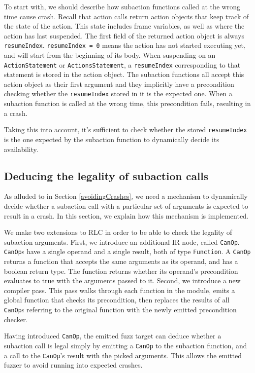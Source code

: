 To start with, we should describe how subaction functions called at the wrong time cause crash.
Recall that action calls return action objects that keep track of the state of the action.
This state includes frame variables, as well as where the action has last suspended.
The first field of the returned action object is always \texttt{resumeIndex}.
\texttt{resumeIndex = 0} means the action has not started executing yet, and will start from the beginning of its body.
When suspending on an \texttt{ActionStatement} or \texttt{ActionsStatement}, a \texttt{resumeIndex} corresponding to that statement is stored in the action object.
The subaction functions all accept this action object as their first argument and they implicitly have a precondition checking whether the \texttt{resumeIndex} stored in it is the expected one.
When a subaction function is called at the wrong time, this precondition fails, resulting in a crash.

Taking this into account, it's sufficient to check whether the stored \texttt{resumeIndex} is the one expected by the subaction function to dynamically decide its availability.

\subsection{Deducing the legality of subaction calls}
As alluded to in Section \ref{avoidingCrashes}, we need a mechanism to dynamically decide whether a subaction call with a particular set of arguments is expected to result in a crash.
In this section, we explain how this mechanism is implemented.

We make two extensions to RLC in order to be able to check the legality of subaction arguments.
First, we introduce an additional IR node, called \texttt{CanOp}.
\texttt{CanOp}s have a single operand and a single result, both of type \texttt{Function}.
A \texttt{CanOp} returns a function that accepts the same arguments as its operand, and has a boolean return type.
The function returns whether its operand's precondition evaluates to true with the arguments passed to it.
Second, we introduce a new compiler pass.
This pass walks through each function in the module, emits a global function that checks its precondition, then replaces the results of all \texttt{CanOp}s referring to the original function with the newly emitted precondition checker.

Having introduced \texttt{CanOp}, the emitted fuzz target can deduce whether a subaction call is legal simply by emitting a \texttt{CanOp} to the subaction function, and a call to the \texttt{CanOp}'s result with the picked arguments.
This allows the emitted fuzzer to avoid running into expected crashes.

